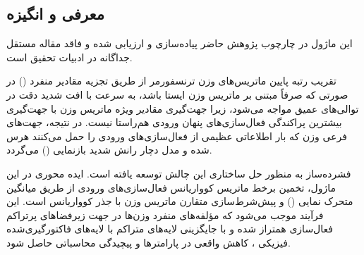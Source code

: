 \subsection{معرفی و انگیزه}
این ماژول در چارچوب پژوهش حاضر پیاده‌سازی و ارزیابی شده و فاقد مقاله مستقل جداگانه در ادبیات تحقیق است.

تقریب رتبه پایین ماتریس‌های وزن ترنسفورمر از طریق تجزیه مقادیر منفرد () در صورتی که صرفاً مبتنی بر ماتریس وزن ایستا باشد، به سرعت با افت شدید دقت در توالی‌های عمیق مواجه می‌شود، زیرا جهت‌گیری مقادیر ویژه ماتریس وزن با جهت‌گیری بیشترین پراکندگی فعال‌سازی‌های پنهان ورودی هم‌راستا نیست. در نتیجه، جهت‌های فرعی وزن که بار اطلاعاتی عظیمی از فعال‌سازی‌های ورودی را حمل می‌کنند هرس شده و مدل دچار رانش شدید بازنمایی () می‌گردد.

فشرده‌ساز  به منظور حل ساختاری این چالش توسعه یافته است. ایده محوری در این ماژول، تخمین برخط ماتریس کوواریانس فعال‌سازی‌های ورودی از طریق میانگین متحرک نمایی () و پیش‌شرط‌سازی متقارن ماتریس وزن با جذر کوواریانس است. این فرآیند موجب می‌شود که مؤلفه‌های منفرد وزن‌ها در جهت زیرفضاهای پرتراکم فعال‌سازی همتراز شده و با جایگزینی لایه‌های متراکم با لایه‌های فاکتورگیری‌شده فیزیکی ، کاهش واقعی در پارامترها و پیچیدگی محاسباتی حاصل شود.
